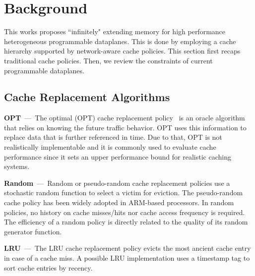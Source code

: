 

\section{Background}\label{sec:back}
This works proposes ``infinitely" extending memory for high performance heterogeneous programmable dataplanes.
This is done by employing a cache hierarchy supported by network-aware cache policies.
This section first recaps traditional cache policies. 
Then, we review the constraints of current programmable dataplanes.

\subsection{Cache Replacement Algorithms}
\textbf{OPT}~---~The optimal (OPT) cache replacement policy~\cite{Belady:66} is an oracle algorithm that relies on knowing the future traffic behavior.
OPT uses this information to replace data that is further referenced in time.
Due to that, OPT is not realistically implementable and it is commonly used to evaluate cache performance since it sets an upper performance bound for realistic caching systems.

\textbf{Random}~---~Random or pseudo-random cache replacement policies use a stochastic random function to select a victim for eviction.
The pseudo-random cache policy has been widely adopted in ARM-based processors.
In random policies, no history on cache misses/hits nor cache access frequency is required.
The efficiency of a random policy is directly related to the quality of its random generator function.

\textbf{LRU}~---~The LRU cache replacement policy evicts the most ancient cache entry in case of a cache miss.
A possible LRU implementation uses a timestamp tag to sort cache entries by recency.%

